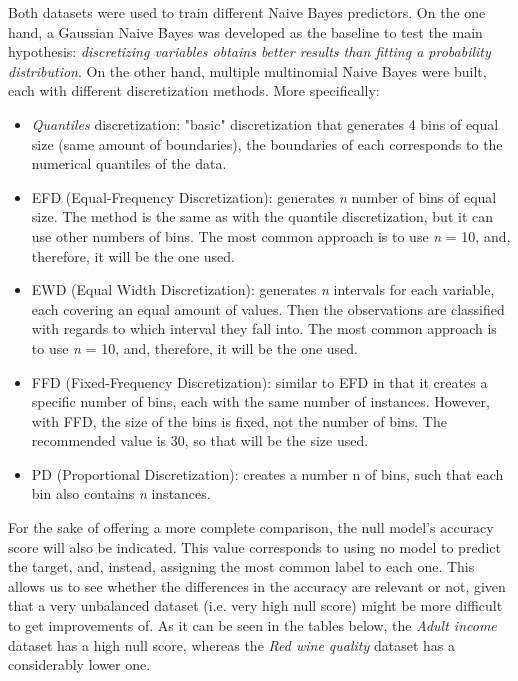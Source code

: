 \documentclass{article}
\begin{document}
Both datasets were used to train different Naive Bayes predictors. On the one hand, a Gaussian Naive Bayes was developed as the baseline to test the main hypothesis: \emph{discretizing variables obtains better results than fitting a probability distribution}. On the other hand, multiple multinomial Naive Bayes were built, each with different discretization methods. More specifically:

\begin{itemize} 
    \item\emph{Quantiles} discretization: "basic" discretization that generates 4 bins of equal size (same amount of boundaries), the boundaries of each corresponds to the numerical quantiles of the data.
    \item EFD (Equal-Frequency Discretization): generates \emph{n} number of bins of equal size. The method is the same as with the quantile discretization, but it can use other numbers of bins. The most common approach is to use \emph{n} = 10, and, therefore, it will be the one used.
    \item EWD (Equal Width Discretization): generates \emph{n} intervals for each variable, each covering an equal amount of values. Then the observations are classified with regards to which interval they fall into. The most common approach is to use \emph{n} = 10, and, therefore, it will be the one used.
    \item FFD (Fixed-Frequency Discretization): similar to EFD in that it creates a specific number of bins, each with the same number of instances. However, with FFD, the size of the bins is fixed, not the number of bins. The recommended value is 30, so that will be the size used.
    \item PD (Proportional Discretization): creates a number n of bins, such that each bin also contains \emph{n} instances.
\end{itemize} 

For the sake of offering a more complete comparison, the null model's accuracy score will also be indicated. This value corresponds to using no model to predict the target, and, instead, assigning the most common label to each one. This allows us to see whether the differences in the accuracy are relevant or not, given that a very unbalanced dataset (i.e. very high null score) might be more difficult to get improvements of. As it can be seen in the tables below, the \emph{Adult income} dataset has a high null score, whereas the \emph{Red wine quality} dataset has a considerably lower one.
\end{document}
